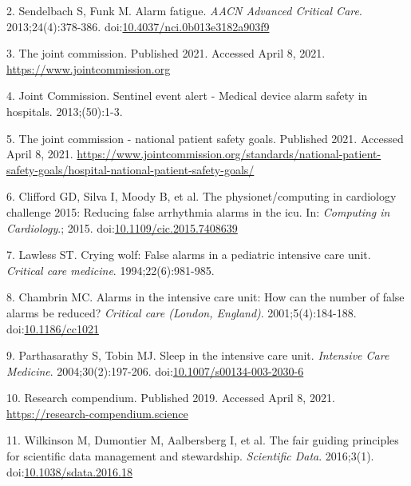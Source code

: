 \documentclass[12pt,twoside]{fmupthesis}
\begin{document}
\leavevmode\hypertarget{ref-sendelbach2013}{}%
2. Sendelbach S, Funk M. Alarm fatigue. \emph{AACN Advanced Critical Care}. 2013;24(4):378-386. doi:\href{https://doi.org/10.4037/nci.0b013e3182a903f9}{10.4037/nci.0b013e3182a903f9}

\leavevmode\hypertarget{ref-the_jc}{}%
3. The joint commission. Published 2021. Accessed April 8, 2021. \url{https://www.jointcommission.org}

\leavevmode\hypertarget{ref-JointCommission2013}{}%
4. Joint Commission. Sentinel event alert - Medical device alarm safety in hospitals. 2013;(50):1-3.

\leavevmode\hypertarget{ref-the_jc2021}{}%
5. The joint commission - national patient safety goals. Published 2021. Accessed April 8, 2021. \url{https://www.jointcommission.org/standards/national-patient-safety-goals/hospital-national-patient-safety-goals/}

\leavevmode\hypertarget{ref-Clifford2015}{}%
6. Clifford GD, Silva I, Moody B, et al. The physionet/computing in cardiology challenge 2015: Reducing false arrhythmia alarms in the icu. In: \emph{Computing in Cardiology}.; 2015. doi:\href{https://doi.org/10.1109/cic.2015.7408639}{10.1109/cic.2015.7408639}

\leavevmode\hypertarget{ref-Lawless1994}{}%
7. Lawless ST. Crying wolf: False alarms in a pediatric intensive care unit. \emph{Critical care medicine}. 1994;22(6):981-985.

\leavevmode\hypertarget{ref-Chambrin2001}{}%
8. Chambrin MC. Alarms in the intensive care unit: How can the number of false alarms be reduced? \emph{Critical care (London, England)}. 2001;5(4):184-188. doi:\href{https://doi.org/10.1186/cc1021}{10.1186/cc1021}

\leavevmode\hypertarget{ref-Parthasarathy2004}{}%
9. Parthasarathy S, Tobin MJ. Sleep in the intensive care unit. \emph{Intensive Care Medicine}. 2004;30(2):197-206. doi:\href{https://doi.org/10.1007/s00134-003-2030-6}{10.1007/s00134-003-2030-6}

\leavevmode\hypertarget{ref-compendium2019}{}%
10. Research compendium. Published 2019. Accessed April 8, 2021. \url{https://research-compendium.science}

\leavevmode\hypertarget{ref-wilkinson2016}{}%
11. Wilkinson M, Dumontier M, Aalbersberg I, et al. The fair guiding principles for scientific data management and stewardship. \emph{Scientific Data}. 2016;3(1). doi:\href{https://doi.org/10.1038/sdata.2016.18}{10.1038/sdata.2016.18}
\end{document}
